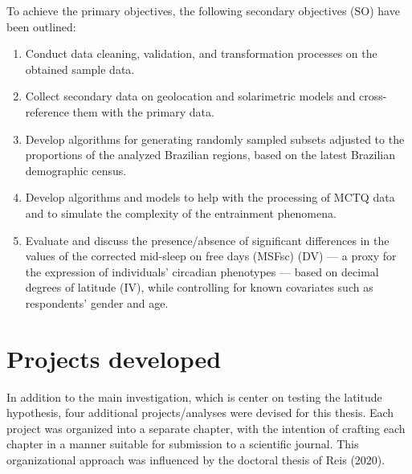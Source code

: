 \documentclass[
  12pt,
  a4paper,
  oneside]{tesesusp}
\begin{document}
\vspace{5pt}

To achieve the primary objectives, the following secondary objectives
(SO) have been outlined:

\vspace{5pt}

\begin{enumerate}
\def\labelenumi{\roman{enumi})}
\item
  Conduct data cleaning, validation, and transformation processes on the
  obtained sample data.
\item
  Collect secondary data on geolocation and solarimetric models and
  cross-reference them with the primary data.
\item
  Develop algorithms for generating randomly sampled subsets adjusted to
  the proportions of the analyzed Brazilian regions, based on the latest
  Brazilian demographic census.
\item
  Develop algorithms and models to help with the processing of MCTQ data
  and to simulate the complexity of the entrainment phenomena.
\item
  Evaluate and discuss the presence/absence of significant differences
  in the values of the corrected mid-sleep on free days (MSFsc) (DV) ---
  a proxy for the expression of individuals' circadian phenotypes ---
  based on decimal degrees of latitude (IV), while controlling for known
  covariates such as respondents' gender and age.
\end{enumerate}

\hypertarget{projects-developed}{%
\section{Projects developed}\label{projects-developed}}

In addition to the main investigation, which is center on testing the
latitude hypothesis, four additional projects/analyses were devised for
this thesis. Each project was organized into a separate chapter, with
the intention of crafting each chapter in a manner suitable for
submission to a scientific journal. This organizational approach was
influenced by the doctoral thesis of Reis (2020).
\end{document}
